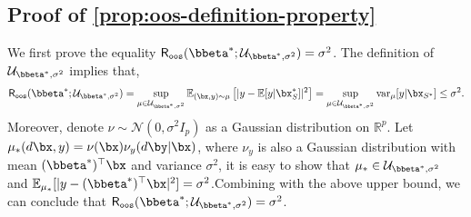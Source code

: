 \documentclass[10pt]{article}
\numberwithin{equation}{section}
\begin{document}
\subsection{Proof of \cref{prop:oos-definition-property}}
\label{prop:oos-definition-property-proof}

We first prove the equality $\mathsf{R}_{\mathtt{oos}}(\bbeta^*;\mathcal{U}_{\bbeta^*, \sigma^2})=\sigma^2$. The definition of $\mathcal{U}_{\bbeta^*, \sigma^2}$ implies that,
\begin{align*}
    \mathsf{R}_{\mathtt{oos}}(\bbeta^*;\mathcal{U}_{\bbeta^*, \sigma^2}) = \sup_{\mu \in \mathcal{U}_{\bbeta^*, \sigma^2}} \mathbb{E}_{(\bx,y)\sim \mu} \left[ |y - \mathbb{E}[y|\bx_S^*] |^2 \right] = \sup_{\mu \in \mathcal{U}_{\bbeta^*, \sigma^2}} \mathrm{var}_\mu [y|\bx_{S^*}] \le \sigma^2.
\end{align*} Moreover, denote $\nu \sim \mathcal{N}(0, \sigma^2 I_{p})$ as a Gaussian distribution on $\mathbb{R}^{p}$. Let $\mu_*(d\bx, y) = \nu(\bx) \nu_y(d\by|\bx)$, where $\nu_y$ is also a Gaussian distribution with mean $(\bbeta^*)^\top \bx$ and variance $\sigma^2$, it is easy to show that $\mu_* \in \mathcal{U}_{\bbeta^*, \sigma^2}$ and $\mathbb{E}_{\mu_*} [|y - (\bbeta^*)^\top \bx|^2] = \sigma^2$.Combining with the above upper bound, we can conclude that $\mathsf{R}_{\mathtt{oos}}(\bbeta^*;\mathcal{U}_{\bbeta^*, \sigma^2})=\sigma^2$.
\end{document}

